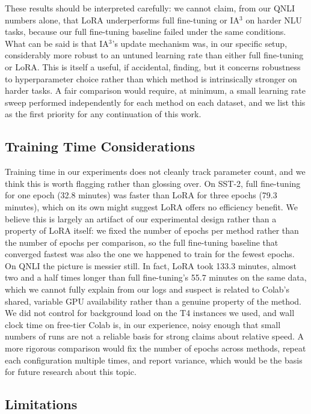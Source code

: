 \documentclass[11pt]{article}
\begin{document}
These results should be interpreted carefully: we cannot
claim, from our QNLI numbers alone, that LoRA underperforms full
fine-tuning or IA$^3$ on harder NLU tasks, because our full fine-tuning
baseline failed under the same conditions. What can be said is that
IA$^3$'s update mechanism was, in our specific setup, considerably more
robust to an untuned learning rate than either full fine-tuning or LoRA.
This is itself a useful, if accidental, finding, but it concerns
robustness to hyperparameter choice rather than which method is intrinsically stronger on harder tasks. A fair
comparison would require, at minimum, a small learning rate sweep
performed independently for each method on each dataset, and we list
this as the first priority for any continuation of this work.

\subsection{Training Time Considerations}

Training time in our experiments does not cleanly track parameter count,
and we think this is worth flagging rather than glossing over. On SST-2,
full fine-tuning for one epoch (32.8 minutes) was faster than LoRA for
three epochs (79.3 minutes), which on its own might suggest LoRA offers
no efficiency benefit. We believe this is largely an artifact of our
experimental design rather than a property of LoRA itself: we fixed the
number of epochs per method rather than the number of epochs per
comparison, so the full fine-tuning baseline that converged fastest was
also the one we happened to train for the fewest epochs. On QNLI the
picture is messier still. In fact, LoRA took 133.3 minutes, almost two and a
half times longer than full fine-tuning's 55.7 minutes on the same
data, which we cannot fully explain from our logs and suspect is
related to Colab's shared, variable GPU availability rather than a
genuine property of the method. We did not control for background load
on the T4 instances we used, and wall clock time on free-tier Colab is,
in our experience, noisy enough that small numbers of runs are not a
reliable basis for strong claims about relative speed. A more rigorous
comparison would fix the number of epochs across methods, repeat each
configuration multiple times, and report variance, which would be the basis for future research about this topic.

\subsection{Limitations}
\end{document}

